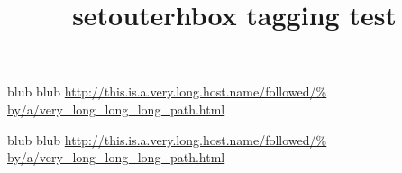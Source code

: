 \documentclass[a5paper]{article}
\title{setouterhbox tagging test}
\begin{document}
\raggedright

blub blub
\url{http://this.is.a.very.long.host.name/followed/%
by/a/very_long_long_long_path.html}%

\sbox{}%
\unhbox\testbox

\begin{setouterhbox}{\testbox}%
blub blub
\url{http://this.is.a.very.long.host.name/followed/%
by/a/very_long_long_long_path.html}%
\end{setouterhbox}
\unhbox\testbox
\end{document}
